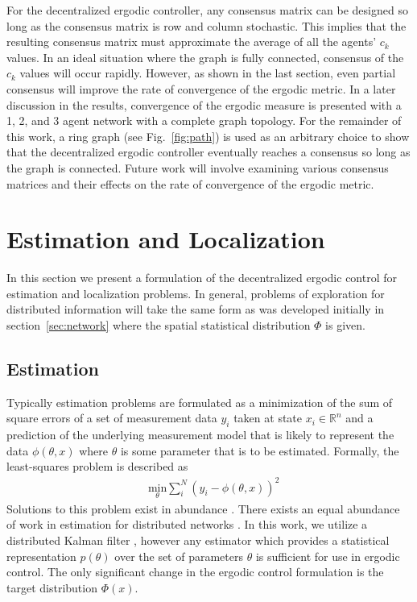 \documentclass[conference]{IEEEtran}
\begin{document}
For the decentralized ergodic controller, any consensus matrix can be designed so long as the consensus matrix is row and column stochastic. This implies that the resulting consensus matrix must approximate the average of all the agents' $c_k$ values. In an ideal situation where the graph is fully connected, consensus of the $c_k$ values will occur rapidly. However, as shown in the last section, even partial consensus will improve the rate of convergence of the ergodic metric. In a later discussion in the results, convergence of the ergodic measure is presented with a 1, 2, and 3 agent network with a complete graph topology. For the remainder of this work, a ring graph (see Fig.~\ref{fig:path}) is used as an arbitrary choice to show that the decentralized ergodic controller eventually reaches a consensus so long as the graph is connected. Future work will involve examining various consensus matrices and their effects on the rate of convergence of the ergodic metric.
\section{Estimation and Localization} \label{sec:est}

In this section we present a formulation of the decentralized ergodic control for estimation and localization problems. In general, problems of exploration for distributed information will take the same form as was developed initially in section~\ref{sec:network} where the spatial statistical distribution $\Phi$ is given.

\subsection{Estimation}

Typically estimation problems are formulated as a minimization of the sum of square errors of a set of measurement data $y_i$ taken at state $x_i \in \mathbb{R}^n$ and a prediction of the underlying measurement model that is likely to represent the data $\phi(\theta, x)$ where $\theta$ is some parameter that is to be estimated. Formally, the least-squares problem is described as
\begin{equation} \label{eq:leastSquares}
\begin{aligned}
& \underset{\theta}{\text{min}} \sum_{i}^{N} (y_i - \phi(\theta, x))^2
\end{aligned}
\end{equation}
Solutions to this problem exist in abundance \cite{marquardt1963algorithm, julier1997new, wan2000unscented}. There exists an equal abundance of work in estimation for distributed networks \cite{carli2008distributed, liu2014distributed, arablouei2014distributed}. In this work, we utilize a distributed Kalman filter \cite{carli2008distributed}, however any estimator which provides a statistical representation $p(\theta)$ over the set of parameters $\theta$ is sufficient for use in ergodic control. The only significant change in the ergodic control formulation is the target distribution $\Phi(x)$.
\end{document}
